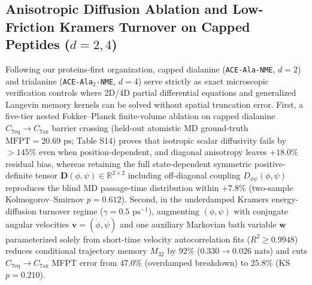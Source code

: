 \documentclass[10pt,letterpaper]{article}
\begin{document}
\subsection{Anisotropic Diffusion Ablation and Low-Friction Kramers Turnover on Capped Peptides ($d = 2, 4$)}
Following our proteins-first organization, capped dialanine (\texttt{ACE-Ala-NME}, $d=2$) and trialanine (\texttt{ACE-Ala$_2$-NME}, $d=4$) serve strictly as exact microscopic verification controls where 2D/4D partial differential equations and generalized Langevin memory kernels can be solved without spatial truncation error. First, a five-tier nested Fokker--Planck finite-volume ablation on capped dialanine $C_{7\mathrm{eq}} \to C_{7\mathrm{ax}}$ barrier crossing (held-out atomistic MD ground-truth $\mathrm{MFPT} = 20.69\text{ ps}$; Table S14) proves that isotropic scalar diffusivity fails by $>145\%$ even when position-dependent, and diagonal anisotropy leaves $+18.0\%$ residual bias, whereas retaining the full state-dependent symmetric positive-definite tensor $\mathbf{D}(\phi,\psi) \in \mathbb{R}^{2\times 2}$ including off-diagonal coupling $D_{\phi\psi}(\phi,\psi)$ reproduces the blind MD passage-time distribution within $+7.8\%$ (two-sample Kolmogorov--Smirnov $p = 0.612$). Second, in the underdamped Kramers energy-diffusion turnover regime ($\gamma = 0.5\text{ ps}^{-1}$), augmenting $(\phi,\psi)$ with conjugate angular velocities $\mathbf{v} = (\dot{\phi},\dot{\psi})$ and one auxiliary Markovian bath variable $\mathbf{w}$ parameterized solely from short-time velocity autocorrelation fits ($R^2 \ge 0.9948$) reduces conditional trajectory memory $M_{32}$ by $92\%$ ($0.330 \to 0.026\text{ nats}$) and cuts $C_{7\mathrm{eq}}\to C_{7\mathrm{ax}}$ MFPT error from $47.0\%$ (overdamped breakdown) to $25.8\%$ (KS $p = 0.210$).
\end{document}
